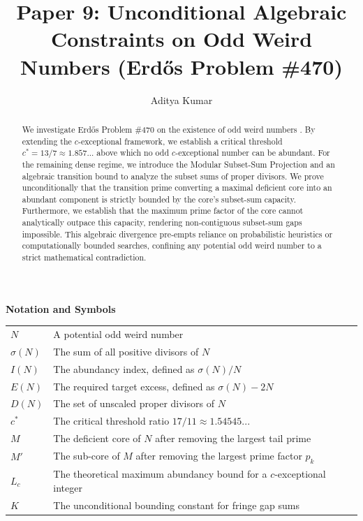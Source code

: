 \documentclass{erdos_paper}
\title{Paper 9: Unconditional Algebraic Constraints on Odd Weird Numbers (Erdős Problem \#470)}
\author{Aditya Kumar}
\begin{document}
\maketitle

\begin{abstract}
We investigate Erdős Problem \#470 on the existence of odd weird numbers \cite{benkoski1974}. By extending the $c$-exceptional framework, we establish a critical threshold $c^{\ast} = 13/7 \approx 1.857...$ above which no odd $c$-exceptional number can be abundant. For the remaining dense regime, we introduce the Modular Subset-Sum Projection and an algebraic transition bound to analyze the subset sums of proper divisors. We prove unconditionally that the transition prime converting a maximal deficient core into an abundant component is strictly bounded by the core's subset-sum capacity. Furthermore, we establish that the maximum prime factor of the core cannot analytically outpace this capacity, rendering non-contiguous subset-sum gaps impossible. This algebraic divergence pre-empts reliance on probabilistic heuristics or computationally bounded searches, confining any potential odd weird number to a strict mathematical contradiction.
\end{abstract}

\vspace{0.5em}
\noindent\textbf{Notation and Symbols}\\
\vspace{0.5em}
\noindent
\begin{tabular}{@{}p{} p{}@{}}
$N$ & A potential odd weird number \\
$\sigma(N)$ & The sum of all positive divisors of $N$ \\
$I(N)$ & The abundancy index, defined as $\sigma(N)/N$ \\
$E(N)$ & The required target excess, defined as $\sigma(N) - 2N$ \\
$D(N)$ & The set of unscaled proper divisors of $N$ \\
$c^{\ast}$ & The critical threshold ratio $17/11 \approx 1.54545...$ \\
$M$ & The deficient core of $N$ after removing the largest tail prime \\
$M'$ & The sub-core of $M$ after removing the largest prime factor $p_k$ \\
$L_c$ & The theoretical maximum abundancy bound for a $c$-exceptional integer \\
$K$ & The unconditional bounding constant for fringe gap sums \\
\end{tabular}
\end{document}
